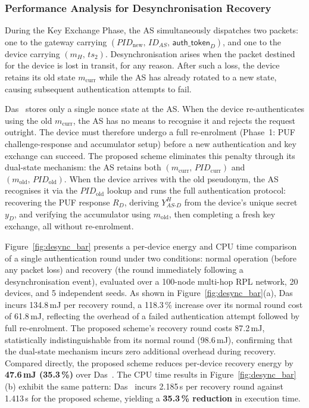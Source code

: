 \documentclass[conference]{IEEEtran}
\begin{document}
\subsubsection{Performance Analysis for Desynchronisation Recovery}
\label{sec:desync_perf}

During the Key Exchange Phase, the AS simultaneously dispatches two
packets: one to the gateway carrying
$(\mathit{PID}_{\mathrm{new}},\, ID_{AS},\, \mathsf{auth\_token}_D)$, and one to the
device carrying $(m_H,\, ts_2)$.
Desynchronisation arises when the packet destined for the device is
lost in transit, for any reason.
After such a loss, the device retains its old state $m_{\mathrm{curr}}$
while the AS has already rotated to a new state, causing subsequent
authentication attempts to fail.

Das~\cite{das2026comsnets} stores only a single nonce state at the AS.
When the device re-authenticates using the old $m_{\mathrm{curr}}$,
the AS has no means to recognise it and rejects the request outright.
The device must therefore undergo a full re-enrolment
(Phase~1: PUF challenge-response and accumulator setup) before a new
authentication and key exchange can succeed.
The proposed scheme eliminates this penalty through its dual-state
mechanism: the AS retains both $(m_{\mathrm{curr}},\,\mathit{PID}_{\mathrm{curr}})$
and $(m_{\mathrm{old}},\,\mathit{PID}_{\mathrm{old}})$.
When the device arrives with the old pseudonym, the AS recognises it
via the $\mathit{PID}_{\mathrm{old}}$ lookup and runs the full
authentication protocol: recovering the PUF response $R_D$, deriving
$Y_{AS\text{-}D}^H$ from the device's unique secret $y_D$, and
verifying the accumulator using $m_{\mathrm{old}}$, then completing
a fresh key exchange, all without re-enrolment.

Figure~\ref{fig:desync_bar} presents a per-device energy and CPU time
comparison of a single authentication round under two conditions:
normal operation (before any packet loss) and recovery (the round
immediately following a desynchronisation event), evaluated over a
100-node multi-hop RPL network, 20 devices, and 5 independent seeds.
As shown in Figure~\ref{fig:desync_bar}(a), Das~\cite{das2026comsnets}
incurs 134.8\,mJ per recovery round, a 118.3\,\% increase over its
normal round cost of 61.8\,mJ, reflecting the overhead of a failed
authentication attempt followed by full re-enrolment.
The proposed scheme's recovery round costs 87.2\,mJ, statistically
indistinguishable from its normal round (98.6\,mJ), confirming that
the dual-state mechanism incurs zero additional overhead during
recovery.
Compared directly, the proposed scheme reduces per-device recovery
energy by \textbf{47.6\,mJ (35.3\,\%)} over Das~\cite{das2026comsnets}.
The CPU time results in Figure~\ref{fig:desync_bar}(b) exhibit the
same pattern: Das~\cite{das2026comsnets} incurs 2.185\,s per recovery
round against 1.413\,s for the proposed scheme, yielding a
\textbf{35.3\,\% reduction} in execution time.
\end{document}
